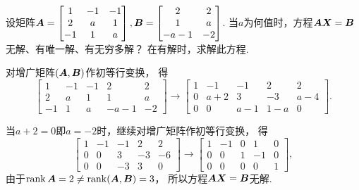 \begin{example}
设矩阵\(\boldsymbol{A} = \begin{bmatrix}
	1 & -1 & -1 \\
	2 & a & 1 \\
	-1 & 1 & a
\end{bmatrix},
\boldsymbol{B} = \begin{bmatrix}
	2 & 2 \\
	1 & a \\
	-a-1 & -2
\end{bmatrix}\).
当\(a\)为何值时，方程\(\boldsymbol{A}\boldsymbol{X}=\boldsymbol{B}\)无解、有唯一解、有无穷多解？
在有解时，求解此方程.
\begin{solution}
对增广矩阵\((\boldsymbol{A},\boldsymbol{B})\)作初等行变换，
得\begin{equation*}
	\begin{bmatrix}
		1 & -1 & -1 & 2 & 2 \\
		2 & a & 1 & 1 & a \\
		-1 & 1 & a & -a-1 & -2
	\end{bmatrix}
	\to \begin{bmatrix}
		1 & -1 & -1 & 2 & 2 \\
		0 & a+2 & 3 & -3 & a-4 \\
		0 & 0 & a-1 & 1-a & 0
	\end{bmatrix}.
\end{equation*}

当\(a+2=0\)即\(a=-2\)时，继续对增广矩阵作初等行变换，
得\begin{equation*}
	\begin{bmatrix}
		1 & -1 & -1 & 2 & 2 \\
		0 & 0 & 3 & -3 & -6 \\
		0 & 0 & -3 & 3 & 0
	\end{bmatrix}
	\to \begin{bmatrix}
		1 & -1 & 0 & 1 & 0 \\
		0 & 0 & 1 & -1 & 0 \\
		0 & 0 & 0 & 0 & 1
	\end{bmatrix},
\end{equation*}
由于\(\rank\boldsymbol{A} = 2 \neq \rank(\boldsymbol{A},\boldsymbol{B}) = 3\)，
所以方程\(\boldsymbol{A}\boldsymbol{X}=\boldsymbol{B}\)无解.


\end{solution}
\end{example}
